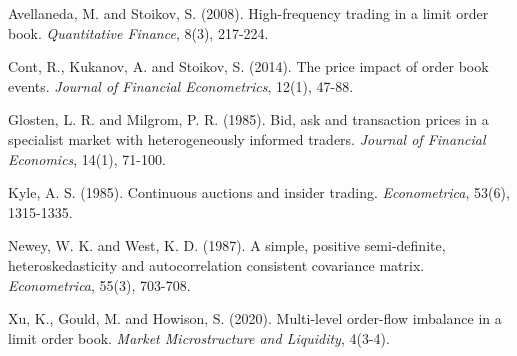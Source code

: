 \documentclass[11pt]{article}
\newenvironment{reflist}{%
  \par\setlength{\parindent}{0pt}%
  \begin{list}{}{%
    \setlength{\leftmargin}{1.5em}%
    \setlength{\itemindent}{-1.5em}%
    \setlength{\itemsep}{3pt}%
    \setlength{\parsep}{0pt}%
    \setlength{\topsep}{4pt}%
  }%
}{\end{list}}
\begin{document}
\begin{reflist}
\item Avellaneda, M. and Stoikov, S. (2008). High-frequency trading in a limit order
      book. \emph{Quantitative Finance}, 8(3), 217-224.
\item Cont, R., Kukanov, A. and Stoikov, S. (2014). The price impact of order book
      events. \emph{Journal of Financial Econometrics}, 12(1), 47-88.
\item Glosten, L. R. and Milgrom, P. R. (1985). Bid, ask and transaction prices in a
      specialist market with heterogeneously informed traders. \emph{Journal of
      Financial Economics}, 14(1), 71-100.
\item Kyle, A. S. (1985). Continuous auctions and insider trading. \emph{Econometrica},
      53(6), 1315-1335.
\item Newey, W. K. and West, K. D. (1987). A simple, positive semi-definite,
      heteroskedasticity and autocorrelation consistent covariance matrix.
      \emph{Econometrica}, 55(3), 703-708.
\item Xu, K., Gould, M. and Howison, S. (2020). Multi-level order-flow imbalance in a
      limit order book. \emph{Market Microstructure and Liquidity}, 4(3-4).
\end{reflist}
\end{document}
